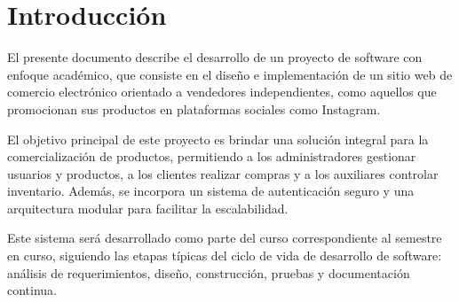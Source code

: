 \section{Introducción}
El presente documento describe el desarrollo de un proyecto de software con enfoque académico, que consiste en el diseño e implementación de un sitio web de comercio electrónico orientado a vendedores independientes, como aquellos que promocionan sus productos en plataformas sociales como Instagram.

El objetivo principal de este proyecto es brindar una solución integral para la comercialización de productos, permitiendo a los administradores gestionar usuarios y productos, a los clientes realizar compras y a los auxiliares controlar inventario. Además, se incorpora un sistema de autenticación seguro y una arquitectura modular para facilitar la escalabilidad.

Este sistema será desarrollado como parte del curso correspondiente al semestre en curso, siguiendo las etapas típicas del ciclo de vida de desarrollo de software: análisis de requerimientos, diseño, construcción, pruebas y documentación continua.
